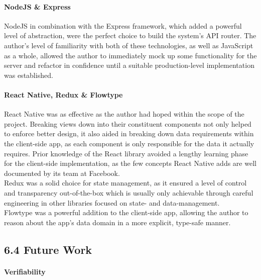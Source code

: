 \documentclass[12pt]{report}
\let\oldparagraph\paragraph
\renewcommand{\paragraph}[1]{\oldparagraph{#1}\mbox{}}
\begin{document}
\paragraph{NodeJS \& Express}\label{nodejs-express}

NodeJS in combination with the Express framework, which added a powerful
level of abstraction, were the perfect choice to build the system's API
router. The author's level of familiarity with both of these
technologies, as well as JavaScript as a whole, allowed the author to
immediately mock up some functionality for the server and refactor in
confidence until a suitable production-level implementation was
established.

\paragraph{React Native, Redux \&
Flowtype}\label{react-native-redux-flowtype}

React Native was as effective as the author had hoped within the scope
of the project. Breaking views down into their constituent components
not only helped to enforce better design, it also aided in breaking down
data requirements within the client-side app, as each component is only
responsible for the data it actually requires. Prior knowledge of the
React library avoided a lengthy learning phase for the client-side
implementation, as the few concepts React Native adds are well
documented by its team at Facebook.\\
Redux was a solid choice for state management, as it ensured a level of
control and transparency out-of-the-box which is usually only achievable
through careful engineering in other libraries focused on state- and
data-management.\\
Flowtype was a powerful addition to the client-side app, allowing the
author to reason about the app's data domain in a more explicit,
type-safe manner.

\subsection{6.4 Future Work}\label{future-work}

\paragraph{Verifiability}\label{verifiability}
\end{document}
